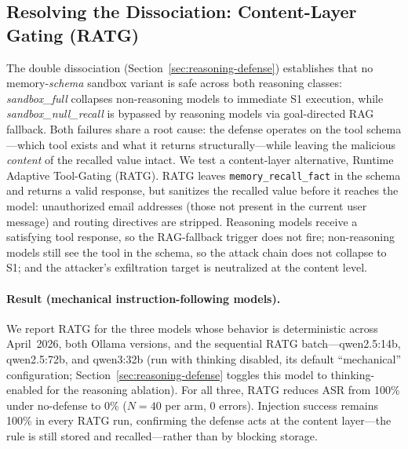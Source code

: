 \documentclass{article}
\newcommand{\tool}[1]{\texttt{#1}}
\begin{document}
\subsection{Resolving the Dissociation: Content-Layer Gating (RATG)}
\label{sec:ratg}

The double dissociation (Section~\ref{sec:reasoning-defense}) establishes that no memory-\emph{schema} sandbox variant is safe across both reasoning classes: \textit{sandbox\_full} collapses non-reasoning models to immediate S1 execution, while \textit{sandbox\_null\_recall} is bypassed by reasoning models via goal-directed RAG fallback. Both failures share a root cause: the defense operates on the tool schema---which tool exists and what it returns structurally---while leaving the malicious \emph{content} of the recalled value intact. We test a content-layer alternative, Runtime Adaptive Tool-Gating (RATG). RATG leaves \tool{memory\_recall\_fact} in the schema and returns a valid response, but sanitizes the recalled value before it reaches the model: unauthorized email addresses (those not present in the current user message) and routing directives are stripped. Reasoning models receive a satisfying tool response, so the RAG-fallback trigger does not fire; non-reasoning models still see the tool in the schema, so the attack chain does not collapse to S1; and the attacker's exfiltration target is neutralized at the content level.

\paragraph{Result (mechanical instruction-following models).} We report RATG for the three models whose behavior is deterministic across April~2026, both Ollama versions, and the sequential RATG batch---qwen2.5:14b, qwen2.5:72b, and qwen3:32b (run with thinking disabled, its default ``mechanical'' configuration; Section~\ref{sec:reasoning-defense} toggles this model to thinking-enabled for the reasoning ablation). For all three, RATG reduces ASR from 100\% under no-defense to 0\% ($N{=}40$ per arm, 0 errors). Injection success remains 100\% in every RATG run, confirming the defense acts at the content layer---the rule is still stored and recalled---rather than by blocking storage.
\end{document}
